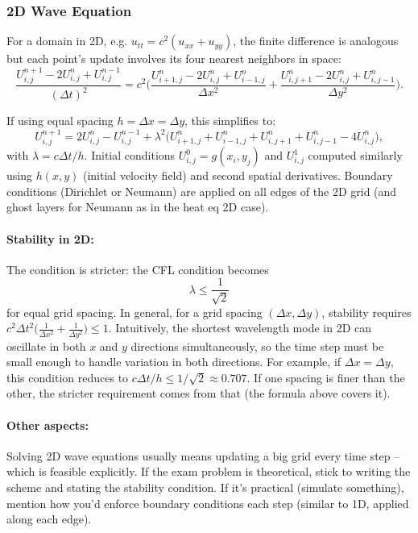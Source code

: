 \documentclass[a4paper,11pt]{article}
\begin{document}
\subsubsection{2D Wave Equation}
For a domain in 2D, e.g. $u_{tt} = c^2(u_{xx}+u_{yy})$, the finite difference is analogous but each point's update involves its four nearest neighbors in space:
$$\frac{U_{i,j}^{n+1} - 2U_{i,j}^n + U_{i,j}^{n-1}}{(\Delta t)^2} = c^2 \Big(\frac{U_{i+1,j}^n - 2U_{i,j}^n + U_{i-1,j}^n}{\Delta x^2} + \frac{U_{i,j+1}^n - 2U_{i,j}^n + U_{i,j-1}^n}{\Delta y^2}\Big).$$

If using equal spacing $h = \Delta x = \Delta y$, this simplifies to:
$$U_{i,j}^{n+1} = 2U_{i,j}^n - U_{i,j}^{n-1} + \lambda^2 \Big(U_{i+1,j}^n + U_{i-1,j}^n + U_{i,j+1}^n + U_{i,j-1}^n - 4U_{i,j}^n\Big),$$
with $\lambda = c\Delta t/h$. Initial conditions $U_{i,j}^0 = g(x_i,y_j)$ and $U_{i,j}^1$ computed similarly using $h(x,y)$ (initial velocity field) and second spatial derivatives. Boundary conditions (Dirichlet or Neumann) are applied on all edges of the 2D grid (and ghost layers for Neumann as in the heat eq 2D case).

\paragraph{Stability in 2D:} The condition is stricter: the CFL condition becomes
$$\lambda \le \frac{1}{\sqrt{2}}$$
for equal grid spacing. In general, for a grid spacing $(\Delta x,\Delta y)$, stability requires $c^2\Delta t^2\Big(\frac{1}{\Delta x^2}+\frac{1}{\Delta y^2}\Big) \le 1$. Intuitively, the shortest wavelength mode in 2D can oscillate in both $x$ and $y$ directions simultaneously, so the time step must be small enough to handle variation in both directions. For example, if $\Delta x = \Delta y$, this condition reduces to $c\Delta t/h \le 1/\sqrt{2} \approx 0.707$. If one spacing is finer than the other, the stricter requirement comes from that (the formula above covers it).

\paragraph{Other aspects:} Solving 2D wave equations usually means updating a big grid every time step -- which is feasible explicitly. If the exam problem is theoretical, stick to writing the scheme and stating the stability condition. If it's practical (simulate something), mention how you'd enforce boundary conditions each step (similar to 1D, applied along each edge).
\end{document}
